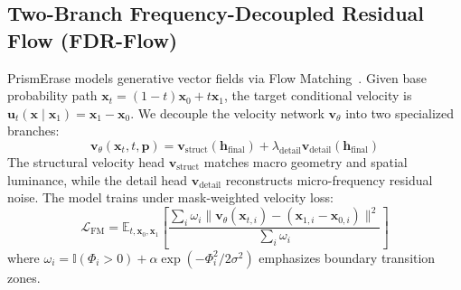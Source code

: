 \documentclass[11pt,a4paper]{article}
\begin{document}
\subsection{Two-Branch Frequency-Decoupled Residual Flow (FDR-Flow)}
\label{sec:fdr_flow}
PrismErase models generative vector fields via Flow Matching~\cite{lipman2022flow}. Given base probability path $\mathbf{x}_t = (1 - t)\mathbf{x}_0 + t\mathbf{x}_1$, the target conditional velocity is $\mathbf{u}_t(\mathbf{x} \mid \mathbf{x}_1) = \mathbf{x}_1 - \mathbf{x}_0$. We decouple the velocity network $\mathbf{v}_\theta$ into two specialized branches:
\begin{equation}
    \mathbf{v}_\theta(\mathbf{x}_t, t, \mathbf{p}) = \mathbf{v}_{\text{struct}}(\mathbf{h}_{\text{final}}) + \lambda_{\text{detail}} \mathbf{v}_{\text{detail}}(\mathbf{h}_{\text{final}})
\end{equation}
The structural velocity head $\mathbf{v}_{\text{struct}}$ matches macro geometry and spatial luminance, while the detail head $\mathbf{v}_{\text{detail}}$ reconstructs micro-frequency residual noise. The model trains under mask-weighted velocity loss:
\begin{equation}
    \mathcal{L}_{\text{FM}} = \mathbb{E}_{t, \mathbf{x}_0, \mathbf{x}_1} \left[ \frac{\sum_i \omega_i \|\mathbf{v}_\theta(\mathbf{x}_{t, i}) - (\mathbf{x}_{1, i} - \mathbf{x}_{0, i})\|^2}{\sum_i \omega_i} \right]
\end{equation}
where $\omega_i = \mathbb{I}(\Phi_i > 0) + \alpha \exp(-\Phi_i^2 / 2\sigma^2)$ emphasizes boundary transition zones.
\end{document}
